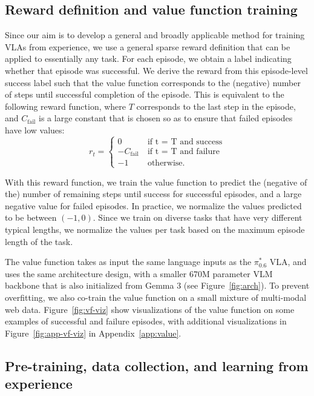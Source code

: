 \documentclass[conference]{IEEEtran}
\def \ModelSymbol {$\pi^{*}_{0.6}$}
\begin{document}
\subsection{Reward definition and value function training}

Since our aim is to develop a general and broadly applicable method for training VLAs from experience, we use a general sparse reward definition that can be applied to essentially any task. For each episode, we obtain a label indicating whether that episode was successful. We derive the reward from this episode-level success label such that the value function corresponds to the (negative) number of steps until successful completion of the episode. This is equivalent to the following reward function, where $T$ corresponds to the last step in the episode, and $C_\text{fail}$ is a large constant that is chosen so as to ensure that failed episodes have low values:
\begin{equation}
r_t = \begin{cases}
0 &\ \text{if t = T and success} \\
-C_\text{fail} &\ \text{if t = T and failure} \\
-1 &\ \text{otherwise}.
\end{cases}
\end{equation}

With this reward function, we train the value function to predict the (negative of the) number of remaining steps until success for successful episodes, and a large negative value for failed episodes. In practice, we normalize the values predicted to be between $(-1, 0)$. Since we train on diverse tasks that have very different typical lengths, we normalize the values per task based on the maximum episode length of the task.

The value function takes as input the same language inputs as the \ModelSymbol{} VLA, and uses the same architecture design, with a smaller 670M parameter VLM backbone that is also initialized from Gemma 3 (see Figure~\ref{fig:arch}). To prevent overfitting, we also co-train the value function on a small mixture of multi-modal web data. Figure~\ref{fig:vf-viz} show visualizations of the value function on some examples of successful and failure episodes, with additional visualizations in Figure~\ref{fig:app-vf-viz} in Appendix~\ref{app:value}.




\subsection{Pre-training, data collection, and learning from experience}
\label{sec:training}
\end{document}
